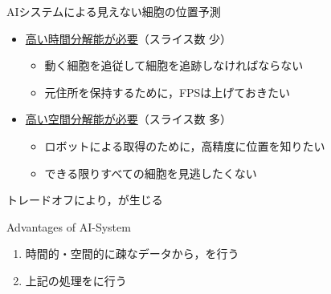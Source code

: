 \begin{frame}{AIシステムによる見えない細胞の位置予測}
    \begin{itemize}
        \item \uline{高い時間分解能が必要}（スライス数 少）
        \begin{itemize}
            \item 動く細胞を追従して細胞を追跡しなければならない
            \item 元住所を保持するために，FPSは上げておきたい
        \end{itemize}
        \vspace{.3zh}
        \item \uline{高い空間分解能が必要}（スライス数 多）
        \begin{itemize}
            \item ロボットによる取得のために，高精度に位置を知りたい
            \item できる限りすべての細胞を見逃したくない
        \end{itemize}
    \end{itemize}
    \vs
    \Ra トレードオフにより，が生じる
    \vspace{1.5zh}
    \begin{block}{Advantages of AI-System}
        \begin{enumerate}
            \item 時間的・空間的に疎なデータから，を行う
            \item 上記の処理をに行う
        \end{enumerate}
    \end{block}
\end{frame}